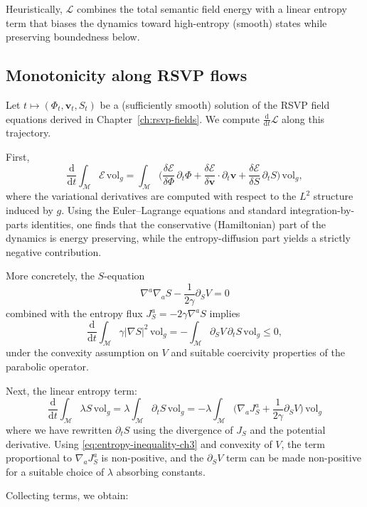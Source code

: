 Heuristically, $\mathscr{L}$ combines the total semantic field energy with a
linear entropy term that biases the dynamics toward high-entropy (smooth) states
while preserving boundedness below.

\subsection{Monotonicity along RSVP flows}

Let $t \mapsto (\Phi_t,\mathbf{v}_t,S_t)$ be a (sufficiently smooth) solution
of the RSVP field equations derived in Chapter~\ref{ch:rsvp-fields}. We compute
$\frac{\mathrm{d}}{\mathrm{d}t} \mathscr{L}$ along this trajectory.

First,
\[
\frac{\mathrm{d}}{\mathrm{d}t} \int_{\mathcal{M}}\mathcal{E}\,\mathrm{vol}_g
= \int_{\mathcal{M}}
\Big(
  \frac{\delta \mathcal{E}}{\delta \Phi}\,\partial_t \Phi
 + \frac{\delta \mathcal{E}}{\delta \mathbf{v}}\cdot \partial_t \mathbf{v}
 + \frac{\delta \mathcal{E}}{\delta S}\,\partial_t S
\Big)\,\mathrm{vol}_g,
\]
where the variational derivatives are computed with respect to the $L^2$
structure induced by $g$. Using the Euler--Lagrange equations and standard
integration-by-parts identities, one finds that the conservative (Hamiltonian)
part of the dynamics is energy preserving, while the entropy-diffusion part
yields a strictly negative contribution.

More concretely, the $S$-equation
\[
\nabla^a \nabla_a S - \frac{1}{2\gamma}\partial_S V = 0
\]
combined with the entropy flux $J_S^a = -2\gamma \nabla^a S$ implies
\[
\frac{\mathrm{d}}{\mathrm{d}t} \int_{\mathcal{M}} \gamma |\nabla S|^2 \,\mathrm{vol}_g
= - \int_{\mathcal{M}} \partial_S V \, \partial_t S \,\mathrm{vol}_g
\le 0,
\]
under the convexity assumption on $V$ and suitable coercivity properties of the
parabolic operator.

Next, the linear entropy term:
\[
\frac{\mathrm{d}}{\mathrm{d}t}\int_{\mathcal{M}} \lambda S \,\mathrm{vol}_g
= \lambda \int_{\mathcal{M}} \partial_t S \,\mathrm{vol}_g
= - \lambda \int_{\mathcal{M}}
\Big(
  \nabla_a J_S^a
  + \frac{1}{2\gamma}\partial_S V
\Big)\,\mathrm{vol}_g
\]
where we have rewritten $\partial_t S$ using the divergence of $J_S$ and the
potential derivative. Using \eqref{eq:entropy-inequality-ch3} and convexity of
$V$, the term proportional to $\nabla_a J_S^a$ is non-positive, and the
$\partial_S V$ term can be made non-positive for a suitable choice of $\lambda$
absorbing constants.

Collecting terms, we obtain:

